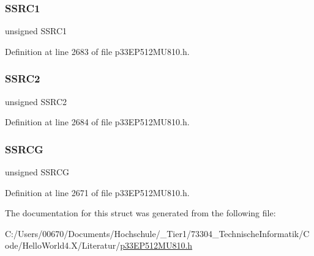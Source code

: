 \subsubsection{\texorpdfstring{S\+S\+R\+C1}{SSRC1}}
{\footnotesize\ttfamily unsigned S\+S\+R\+C1}



Definition at line 2683 of file p33\+E\+P512\+M\+U810.\+h.

\mbox{\label{structtag_a_d2_c_o_n1_b_i_t_s_a95ec48e12cb5dc231b4951f71d394eac}} 
\subsubsection{\texorpdfstring{S\+S\+R\+C2}{SSRC2}}
{\footnotesize\ttfamily unsigned S\+S\+R\+C2}



Definition at line 2684 of file p33\+E\+P512\+M\+U810.\+h.

\mbox{\label{structtag_a_d2_c_o_n1_b_i_t_s_a70991a103c529d7b9b7fde74950ee286}} 
\subsubsection{\texorpdfstring{S\+S\+R\+CG}{SSRCG}}
{\footnotesize\ttfamily unsigned S\+S\+R\+CG}



Definition at line 2671 of file p33\+E\+P512\+M\+U810.\+h.



The documentation for this struct was generated from the following file\+:\begin{DoxyCompactItemize}
\item 
C\+:/\+Users/00670/\+Documents/\+Hochschule/\+\_\+\+Tier1/73304\+\_\+\+Technische\+Informatik/\+Code/\+Hello\+World4.\+X/\+Literatur/\hyperlink{p33_e_p512_m_u810_8h}{p33\+E\+P512\+M\+U810.\+h}\end{DoxyCompactItemize}
